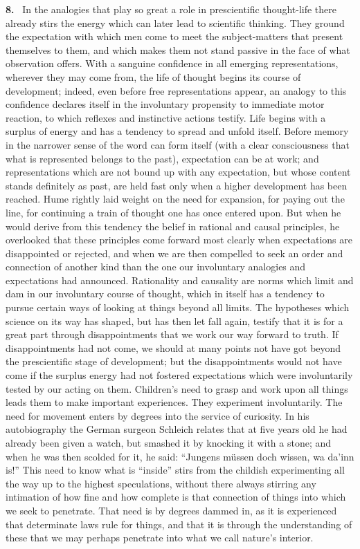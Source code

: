 \documentclass[12pt]{book}
\newcommand{\hnum}[1]{\noindent\textbf{#1.}~}
\newcommand{\opage}[1]{\marginnote{\footnotesize\textit{[#1]}}}
\begin{document}
\hnum{8} In the analogies that play so great a role in prescientific
thought-life there already stirs the energy which can later lead to scientific
thinking. They ground the expectation with which men come to meet the
subject-matters that present themselves to them, and which makes them not stand
passive in the face of what observation offers. With a sanguine confidence in
all emerging representations, wherever they may come from, the life of thought
begins its course of development; indeed, even before free representations
appear, an analogy to this confidence declares itself in the involuntary
propensity to immediate motor reaction, to which reflexes and instinctive
actions testify. Life begins with a surplus of energy and has a tendency to
spread and unfold itself. Before memory in the narrower sense of the word can
form itself (with a clear consciousness that what is \opage{46}represented belongs to the
past), expectation can be at work; and representations which are not bound up
with any expectation, but whose content stands definitely as past, are held fast
only when a higher development has been reached. Hume rightly laid weight on the
need for expansion, for paying out the line, for continuing a train of thought
one has once entered upon. But when he would derive from this tendency the
belief in rational and causal principles, he overlooked that these principles
come forward most clearly when expectations are disappointed or rejected, and
when we are then compelled to seek an order and connection of another kind than
the one our involuntary analogies and expectations had announced. Rationality
and causality are norms which limit and dam in our involuntary course of
thought, which in itself has a tendency to pursue certain ways of looking at
things beyond all limits. The hypotheses which science on its way has shaped,
but has then let fall again, testify that it is for a great part through
disappointments that we work our way forward to truth. If disappointments had
not come, we should at many points not have got beyond the prescientific stage
of development; but the disappointments would not have come if the surplus
energy had not fostered expectations which were involuntarily tested by our
acting on them. Children's need to grasp and work upon all things leads them to
make important experiences. They experiment involuntarily. The need for movement
enters by degrees into the service of curiosity. In his autobiography the German
surgeon Schleich relates that at five years old he had already been given a
watch, but smashed it by knocking it with a stone; and when he was then scolded
for it, he said: ``Jungens müssen doch wissen, wa da'inn is!'' This need to know
what is ``inside'' stirs from \opage{47}the childish experimenting all the way up to the
highest speculations, without there always stirring any intimation of how fine
and how complete is that connection of things into which we seek to penetrate.
That need is by degrees dammed in, as it is experienced that determinate laws
rule for things, and that it is through the understanding of these that we may
perhaps penetrate into what we call nature's interior.
\end{document}
